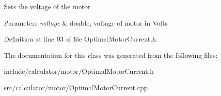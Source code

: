 Sets the voltage of the motor


\begin{DoxyParams}{Parameters}
{\em voltage} & double, voltage of motor in Volts \\
\hline
\end{DoxyParams}


Definition at line 93 of file Optimal\+Motor\+Current.\+h.



The documentation for this class was generated from the following files\+:\begin{DoxyCompactItemize}
\item 
include/calculator/motor/Optimal\+Motor\+Current.\+h\item 
src/calculator/motor/Optimal\+Motor\+Current.\+cpp\end{DoxyCompactItemize}
